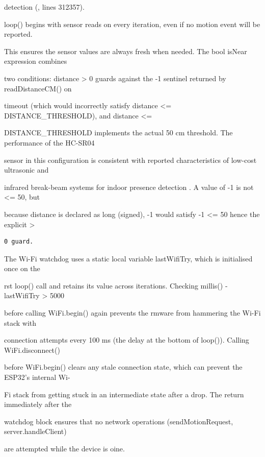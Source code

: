 detection (, lines 312357).

loop() begins with sensor reads on every iteration, even if no motion event will be reported.

This ensures the sensor values are always fresh when needed. The bool isNear expression combines

two conditions: distance > 0 guards against the -1 sentinel returned by readDistanceCM() on

timeout (which would incorrectly satisfy distance <= DISTANCE\_THRESHOLD), and distance <=

DISTANCE\_THRESHOLD implements the actual 50 cm threshold. The performance of the HC-SR04

sensor in this conﬁguration is consistent with reported characteristics of low-cost ultrasonic and

infrared break-beam systems for indoor presence detection \cite{jenkins2024}. A value of -1 is not <= 50, but

because distance is declared as long (signed), -1 would satisfy -1 <= 50  hence the explicit >

\begin{listingbox}
	\begin{verbatim}
0 guard.

\end{verbatim}
\end{listingbox}
The Wi-Fi watchdog uses a static local variable lastWifiTry, which is initialised once on the

rst loop() call and retains its value across iterations. Checking millis() - lastWifiTry > 5000

before calling WiFi.begin() again prevents the rmware from hammering the Wi-Fi stack with

connection attempts every 100 ms (the delay at the bottom of loop()). Calling WiFi.disconnect()

before WiFi.begin() clears any stale connection state, which can prevent the ESP32's internal Wi-

Fi stack from getting stuck in an intermediate state after a drop. The return immediately after the

watchdog block ensures that no network operations (sendMotionRequest, server.handleClient)

are attempted while the device is oine.

